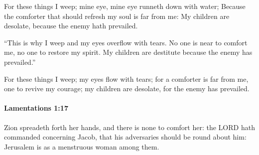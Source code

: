 			\begin{versebox}
					\item[BHS] 
					\item[LXX] 
					\item[ASV] For these things I weep; mine eye, mine eye runneth down with water; Because the comforter that should refresh my soul is far from me: My children are desolate, because the enemy hath prevailed.
					\item[NIV] “This is why I weep and my eyes overflow with tears. No one is near to comfort me, no one to restore my spirit. My children are destitute because the enemy has prevailed.”
					\item[NRSV] For these things I weep; my eyes flow with tears; for a comforter is far from me, one to revive my courage; my children are desolate, for the enemy has prevailed.
			\end{versebox}

		\paragraph{Lamentations 1:17} %
			\label{LAMENTATIONS-1-17}

			Zion spreadeth forth her hands, and there is none to comfort her: the LORD hath commanded concerning Jacob, that his adversaries should be round about him: Jerusalem is as a menstruous woman among them.

